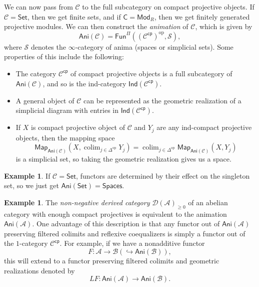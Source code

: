\documentclass[10pt, oneside]{memoir}
\theoremstyle{definition}
\newtheorem{exm}[thm]{Example}
\theoremstyle{remark}
\theoremstyle{plain}
\theoremstyle{definition}
\theoremstyle{remark}
\newcommand{\mc}[1]{\mathcal{#1}}
\newcommand{\ms}[1]{\mathsf{#1}}
\newcommand{\1}{\mathbf{1}}
\newcommand{\2}{\mathbf{2}}
\newcommand{\3}{\mathbf{3}}
\DeclareMathOperator{\op}{op}
\DeclareMathOperator*{\colim}{colim}
\begin{document}
We can now pass from \(\mc{C} \) to the full subcategory on compact projective objects. If \(\mc{C} = \ms{Set} \), then we get finite sets, and if \(\ms{C} = \ms{Mod}_R \), then we get finitely generated projective modules. We can then construct the \textit{animation} of \(\mc{C} \), which is given by
\[ \ms{Ani}(\mc{C}) = \ms{Fun}^{\Pi} ((\mc{C}^{\ms{cp}})^{\op}, \mc{S}), \]
where \(\mc{S} \) denotes the \(\infty \)-category of anima (spaces or simplicial sets). Some properties of this include the following:
\begin{itemize}
    \item The category \(\mc{C}^{\ms{cp}} \) of compact projective objects is a full subcategory of \(\ms{Ani}(\mc{C}) \), and so is the ind-category \(\ms{Ind}(\mc{C}^{\ms{cp}}) \).
    \item A general object of \(\mc{C} \) can be represented as the geometric realization of a simplicial diagram with entries in \(\ms{Ind}(\mc{C}^{\ms{cp}}) \).
    \item If \(X \) is compact projective object of \(\mc{C} \) and \(Y_j \) are any ind-compact projective objects, then the mapping space
    \[ \ms{Map}_{\ms{Ani}(\mc{C})} (X, \colim_{j \in \Delta^{\op}} Y_j) = \colim_{j \in \Delta^{\op}} \ms{Map}_{\ms{Ani}(\mc{C})} (X, Y_j) \]
    is a simplicial set, so taking the geometric realization gives us a space.
\end{itemize}

\begin{exm}
    If \(\mc{C} = \ms{Set} \), functors are determined by their effect on the singleton set, so we just get \(\ms{Ani}(\ms{Set}) = \ms{Spaces} \).
\end{exm}

\begin{exm}
    The \textit{non-negative derived category} \(\mc{D}(\mc{A})_{\geq 0} \) of an abelian category with enough compact projectives is equivalent to the animation \(\ms{Ani}(\mc{A}) \). One advantage of this description is that any functor out of \(\ms{Ani}(\mc{A}) \) preserving filtered colimits and reflexive coequalizers is simply a functor out of the \(1 \)-category \(\mc{C}^{\ms{cp}} \). For example, if we have a nonadditive functor
    \[ F \colon \mc{A} \to \mc{B} (\hookrightarrow \ms{Ani}(\mc{B})), \]
    this will extend to a functor preserving filtered colimits and geometric realizations denoted by
    \[ LF \colon \ms{Ani}(\mc{A}) \to \ms{Ani}(\mc{B}). \]
\end{exm}
\end{document}
